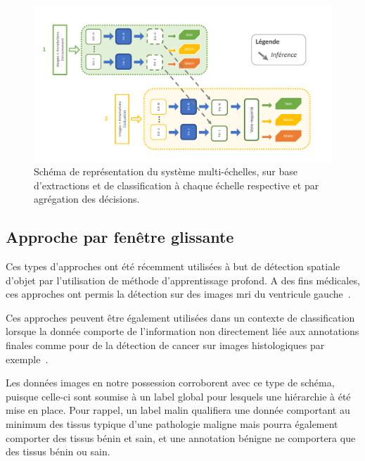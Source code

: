\begin{figure}[H]
    \centering
    \includegraphics[width=\linewidth]{contents/chapter_5/resources/scheme_multiscale_decision.pdf}
    \caption{Schéma de représentation du système multi-échelles, sur base d'extractions et de classification à chaque échelle respective et par agrégation des décisions.}
    \label{fig:scheme_multiscale_decision}
\end{figure}\par

\subsection{Approche par fenêtre glissante}
Ces types d'approches ont été récemment utilisées à but de détection spatiale d'objet par l'utilisation de méthode d'apprentissage profond. A des fins médicales, ces approches ont permis la détection sur des images \gls{mri} du ventricule gauche~\cite{Helwan2017}.\par

Ces approches peuvent être également utilisées dans un contexte de classification lorsque la donnée comporte de l'information non directement liée aux annotations finales comme pour de la détection de cancer sur images histologiques par exemple~\cite{Hou2016,Alqudah2019}.\par

Les données images en notre possession corroborent avec ce type de schéma, puisque celle-ci sont soumise à un label global pour lesquels une hiérarchie à été mise en place. Pour rappel, un label malin qualifiera une donnée comportant au minimum des tissus typique d'une pathologie maligne mais pourra également comporter des tissus bénin et sain, et une annotation bénigne ne comportera que des tissus bénin ou sain.\par

